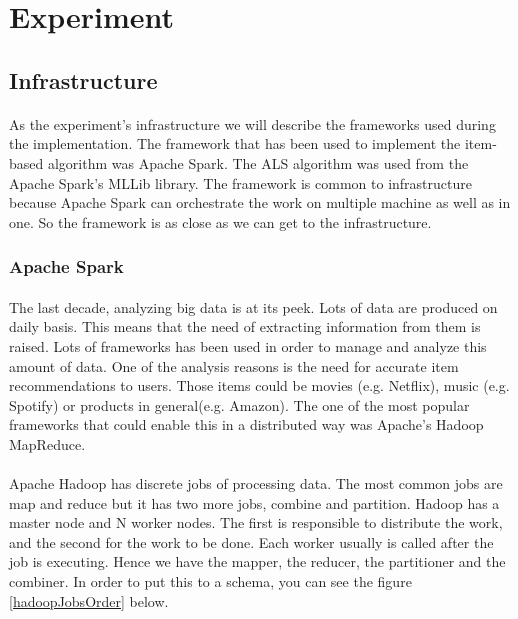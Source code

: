 \newpage
\section{Experiment}
\subsection{Infrastructure}
\paragraph{}As the experiment's infrastructure we will describe the frameworks used during the implementation. The framework that has been used to implement the item-based algorithm was Apache Spark. The ALS algorithm was used from the Apache Spark's MLLib library. The framework is common to infrastructure because Apache Spark can orchestrate the work on multiple machine as well as in one. So the framework is as close as we can get to the infrastructure.

\subsubsection{Apache Spark}
\paragraph{}The last decade, analyzing big data is at its peek. Lots of data are produced on daily basis. This means that the need of extracting information from them is raised. 
Lots of frameworks has been used in order to manage and analyze this amount of data. One of the analysis reasons is the need for accurate item recommendations to users. Those items could be movies (e.g. Netflix), music (e.g. Spotify) or products in general(e.g. Amazon). The one of the most popular frameworks that could enable this in a distributed way was Apache's Hadoop MapReduce.


\paragraph{}Apache Hadoop has discrete jobs of processing data. The most common jobs are map and reduce but it has two more jobs, combine and partition. Hadoop has a master node and N worker nodes. The first is responsible to distribute the work, and the second for the work to be done. Each worker usually is called after the job is executing. Hence we have the mapper, the reducer, the partitioner and the combiner. In order to put this to a schema, you can see the figure \ref{hadoopJobsOrder} below.


